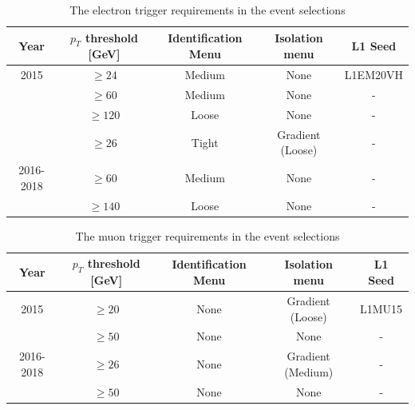 \begin{table}[]
\small
\begin{center}
{\renewcommand{\arraystretch}{1.2}
\begin{tabular}{c|c|c|c|c}
\hline
Year  &  $p_T$ threshold [GeV]   & Identification Menu & Isolation menu & L1 Seed  \\  \hline 
2015   &    $\geq 24  $ &  Medium  &  None	& L1EM20VH	\\
           &   $\geq 60   $ &   Medium  &  None	&  -	\\  
            &  $\geq 120 $ &   Loose  &    None		& -	\\ \hline 
  &   $\geq 26   $ &  Tight  &   Gradient (Loose) 	&  -	\\
2016-2018  &   $\geq 60   $ &   Medium  &  None	&  -	\\  
 &  $\geq 140 $ &   Loose  &  None	&  -	 \\ \hline     
\end{tabular}
\caption{The electron trigger requirements in the event selections}
\label{tab:ElectronTrigs}
}
\end{center}
\end{table}

\begin{table}[]
\small
\begin{center}
{\renewcommand{\arraystretch}{1.2}
\begin{tabular}{c|c|c|c|c}
\hline
Year  &  $p_T$ threshold [GeV]   & Identification Menu & Isolation menu & L1 Seed  \\  \hline 
2015   &    $\geq 20  $ & None  &  Gradient (Loose)	& L1MU15 \\
           &   $\geq 50   $ &   None  &  None	&  -	\\   \hline 
2016-2018  &   $\geq 26   $ &  None  &   Gradient (Medium) 	&  -	\\
  &   $\geq 50   $ &   None  &  None	&  -	\\ \hline   
\end{tabular}
\caption{The muon trigger requirements in the event selections}
\label{tab:MuonTrigs}
}
\end{center}
\end{table}



